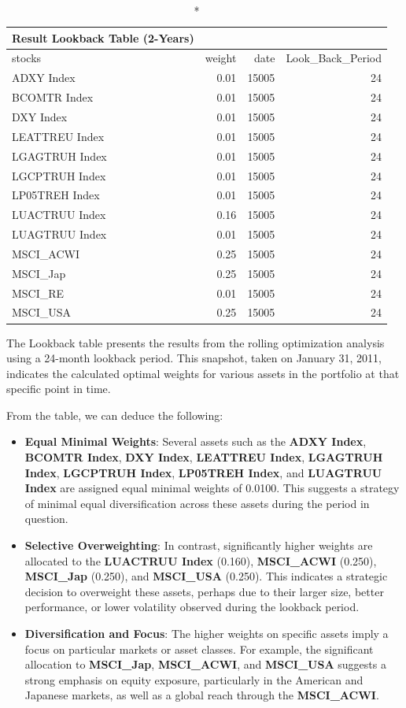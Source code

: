 \documentclass[11pt,preprint, authoryear]{elsarticle}
\numberwithin{equation}{section}
\numberwithin{figure}{section}
\numberwithin{table}{section}
\begin{document}
\begin{longtable}{lrrr}
\caption*{
{\large Result Lookback Table (2-Years)}
} \\ 
\toprule
stocks & weight & date & Look\_Back\_Period \\ 
\midrule
ADXY Index & 0.01 & 15005 & 24 \\ 
BCOMTR Index & 0.01 & 15005 & 24 \\ 
DXY Index & 0.01 & 15005 & 24 \\ 
LEATTREU Index & 0.01 & 15005 & 24 \\ 
LGAGTRUH Index & 0.01 & 15005 & 24 \\ 
LGCPTRUH Index & 0.01 & 15005 & 24 \\ 
LP05TREH Index & 0.01 & 15005 & 24 \\ 
LUACTRUU Index & 0.16 & 15005 & 24 \\ 
LUAGTRUU Index & 0.01 & 15005 & 24 \\ 
MSCI\_ACWI & 0.25 & 15005 & 24 \\ 
MSCI\_Jap & 0.25 & 15005 & 24 \\ 
MSCI\_RE & 0.01 & 15005 & 24 \\ 
MSCI\_USA & 0.25 & 15005 & 24 \\ 
\bottomrule
\end{longtable}

The Lookback table presents the results from the rolling optimization
analysis using a 24-month lookback period. This snapshot, taken on
January 31, 2011, indicates the calculated optimal weights for various
assets in the portfolio at that specific point in time.

From the table, we can deduce the following:

\begin{itemize}
\item
  \textbf{Equal Minimal Weights}: Several assets such as the
  \textbf{ADXY Index}, \textbf{BCOMTR Index}, \textbf{DXY Index},
  \textbf{LEATTREU Index}, \textbf{LGAGTRUH Index}, \textbf{LGCPTRUH
  Index}, \textbf{LP05TREH Index}, and \textbf{LUAGTRUU Index} are
  assigned equal minimal weights of 0.0100. This suggests a strategy of
  minimal equal diversification across these assets during the period in
  question.
\item
  \textbf{Selective Overweighting}: In contrast, significantly higher
  weights are allocated to the \textbf{LUACTRUU Index} (0.160),
  \textbf{MSCI\_ACWI} (0.250), \textbf{MSCI\_Jap} (0.250), and
  \textbf{MSCI\_USA} (0.250). This indicates a strategic decision to
  overweight these assets, perhaps due to their larger size, better
  performance, or lower volatility observed during the lookback period.
\item
  \textbf{Diversification and Focus}: The higher weights on specific
  assets imply a focus on particular markets or asset classes. For
  example, the significant allocation to \textbf{MSCI\_Jap},
  \textbf{MSCI\_ACWI}, and \textbf{MSCI\_USA} suggests a strong emphasis
  on equity exposure, particularly in the American and Japanese markets,
  as well as a global reach through the \textbf{MSCI\_ACWI}.
\end{itemize}
\end{document}
